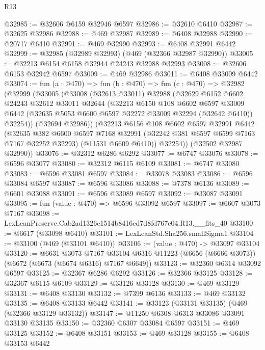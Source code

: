 \begin{lexlean}{R13}
\begin{coremodule}
@32985 := @32606 @6159 @32946 @6597
@32986 := @32610 @6410
@32987 := @32625 @32986
@32988 := @469 @32987
@32989 := @6408 @32988
@32990 := @20717 @6410
@32991 := @469 @32990
@32993 := @6408 @32991 @6442
@32999 := @32985 (@32989 @32993) (@469 (@32366 @32987 @32990))
@33005 := @32213 @6154 @6158 @32944 @24243 @32988 @32993
@33008 := @32606 @6153 @32942 @6597
@33009 := @469 @32986
@33011 := @6408 @33009 @6442
@33074 := fun (a : @470) =>
  fun (b : @470) =>
  fun (c : @470) =>
  @32982
    (@32999
      (@33005
        (@33008
          (@32613 @33011)
          @32988
          (@32629
            @6152
            @6602
            @24243
            @32612
            @33011
            @32644
            (@32213
              @6150
              @108
              @6602
              @6597
              @33009
              @6442
              (@32635 @5053 @6600 @6597 @32272 @33009 @32294 (@32642 @6410))
              @32254))
          (@32694 @32986))
        (@32213
          @6156
          @108
          @6602
          @6597
          @32991
          @6442
          (@32635
            @382
            @6600
            @6597
            @7168
            @32991
            (@32242 @381 @6597 @6599 @7163 @7167 @32252 @32293)
            (@11531 @6609 @6410))
          @32254))
      (@32502 @32987 @32990))
@33076 := @32312 @6286 @6292
@33077 := @6747 @33076
@33078 := @6596 @33077
@33080 := @32312 @6115 @6109
@33081 := @6747 @33080
@33083 := @6596 @33081 @6597
@33084 := @33078 @33083
@33086 := @6596 @33084 @6597
@33087 := @6596 @33086
@33088 := @7378 @6136
@33089 := @6601 @33088
@33091 := @6596 @33089 @6597
@33092 := @33087 @33091
@33095 := fun (value : @470) => @6596 @33092 @6597
@33097 := @6607 @3073 @7167
@33098 := LexLeanPreserve.Cab2ad1326c1514b8416cd7d8fd767c04.R13.__fits_40
@33100 := @6617 (@33098 @6410)
@33101 := LexLeanStd.Sha256.smallSigma1
@33104 := @33100 (@469 (@33101 @6410))
@33106 := (value : @470) -> @33097 @33104
@33120 := @6631
    @3073
    @7167
    @33104
    @6316
    @11223
    (@6656 (@6666 @3073))
    (@6672 (@6673 (@6674 @6316) @7167 @6649))
@33123 := @32360 @6314 @33092 @6597
@33125 := @32367 @6286 @6292
@33126 := @32366 @33125
@33128 := @32367 @6115 @6109
@33129 := @33126 @33128
@33130 := @469 @33129
@33131 := @6408 @33130
@33132 := @7399 @6136
@33133 := @469 @33132
@33135 := @6408 @33133 @6442
@33141 := @33123 (@33131 @33135) (@469 (@32366 @33129 @33132))
@33147 := @11250 @6308 @6313 @33086 @33091 @33130 @33135
@33150 := @32360 @6307 @33084 @6597
@33151 := @469 @33125
@33152 := @6408 @33151
@33153 := @469 @33128
@33155 := @6408 @33153 @6442

\end{coremodule}
\end{lexlean}
